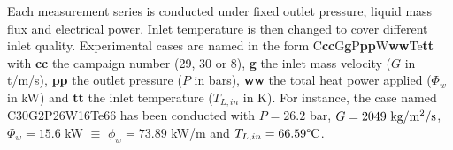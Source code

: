 Each measurement series is conducted under fixed outlet pressure, liquid mass flux and electrical power. Inlet temperature is then changed to cover different inlet quality. Experimental cases are named in the form C\textbf{cc}G\textbf{g}P\textbf{pp}W\textbf{ww}Te\textbf{tt} with \textbf{cc} the campaign number (29, 30 or 8), \textbf{g} the inlet mass velocity ($G$ in t/m/s), \textbf{pp} the outlet pressure ($P$ in bars), \textbf{ww} the total heat power applied ($\Phi_{w}$ in kW) and \textbf{tt} the inlet temperature ($T_{L,in}$ in K). For instance, the case named C30G2P26W16Te66 has been conducted with $P=26.2$ bar, $G=2049\ \text{kg/m$^{2}$/s}$, $\Phi_{w}=15.6$ kW $\equiv$ $\phi_{w} =73.89$ kW/m and $T_{L,in} = 66.59 \degree\mathrm{C}$.


\begin{table}[!h]
\scriptsize
\centering


\noindent{}


\end{table}
